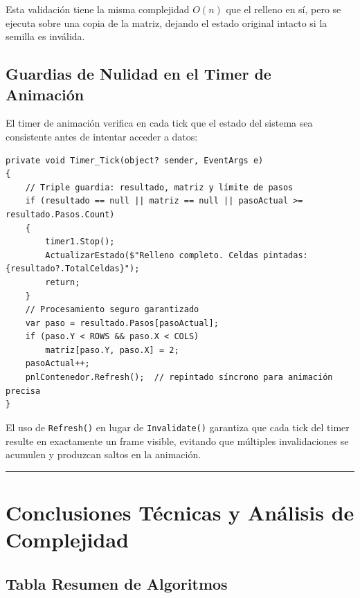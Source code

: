 \documentclass[
  spanish,
  a4paper,
  12pt,
]{article}
\newcommand{\passthrough}[1]{#1}
\begin{document}
Esta validación tiene la misma complejidad \(O(n)\) que el relleno en
sí, pero se ejecuta sobre una copia de la matriz, dejando el estado
original intacto si la semilla es inválida.
\newpage

\subsection{Guardias de Nulidad en el Timer de
Animación}\label{guardias-de-nulidad-en-el-timer-de-animaciuxf3n}

El timer de animación verifica en cada tick que el estado del sistema
sea consistente antes de intentar acceder a datos:

\begin{lstlisting}
private void Timer_Tick(object? sender, EventArgs e)
{
    // Triple guardia: resultado, matriz y límite de pasos
    if (resultado == null || matriz == null || pasoActual >= resultado.Pasos.Count)
    {
        timer1.Stop();
        ActualizarEstado($"Relleno completo. Celdas pintadas: {resultado?.TotalCeldas}");
        return;
    }
    // Procesamiento seguro garantizado
    var paso = resultado.Pasos[pasoActual];
    if (paso.Y < ROWS && paso.X < COLS)
        matriz[paso.Y, paso.X] = 2;
    pasoActual++;
    pnlContenedor.Refresh();  // repintado síncrono para animación precisa
}
\end{lstlisting}

El uso de \passthrough{\lstinline!Refresh()!} en lugar de
\passthrough{\lstinline!Invalidate()!} garantiza que cada tick del timer
resulte en exactamente un frame visible, evitando que múltiples
invalidaciones se acumulen y produzcan saltos en la animación.

\begin{center}\rule{0.5\linewidth}{0.5pt}\end{center}

\section{Conclusiones Técnicas y Análisis de
Complejidad}\label{conclusiones-tuxe9cnicas-y-anuxe1lisis-de-complejidad}

\subsection{Tabla Resumen de
Algoritmos}\label{tabla-resumen-de-algoritmos}
\end{document}

